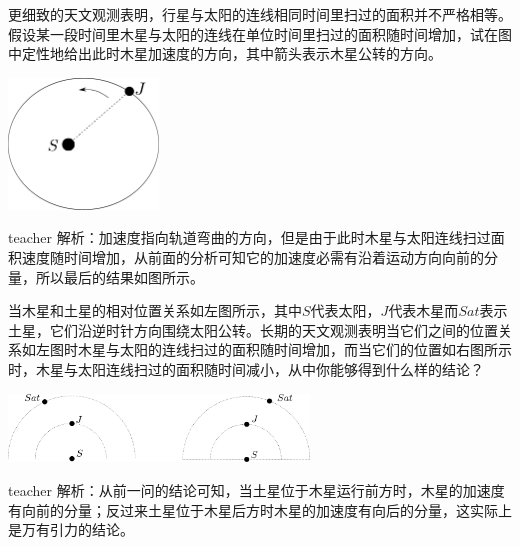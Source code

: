 \begin{example}
更细致的天文观测表明，行星与太阳的连线相同时间里扫过的面积并不严格相等。
假设某一段时间里木星与太阳的连线在单位时间里扫过的面积随时间增加，试在图中定性地给出此时木星加速度的方向，其中箭头表示木星公转的方向。
\begin{flushright}
\includegraphics[width = 0.3\textwidth]{images/motion-problem-25.pdf} 
\end{flushright}
\begin{taggedblock}{teacher}
\noindent
解析：加速度指向轨道弯曲的方向，但是由于此时木星与太阳连线扫过面积速度随时间增加，从前面的分析可知它的加速度必需有沿着运动方向向前的分量，所以最后的结果如图所示。
\end{taggedblock}
\end{example}

\begin{example}
当木星和土星的相对位置关系如左图所示，其中$S$代表太阳，$J$代表木星而$Sat$表示土星，它们沿逆时针方向围绕太阳公转。长期的天文观测表明当它们之间的位置关系如左图时木星与太阳的连线扫过的面积随时间增加，而当它们的位置如右图所示时，木星与太阳连线扫过的面积随时间减小，从中你能够得到什么样的结论？
\begin{flushright}
\includegraphics[width = 0.6\textwidth]{images/motion-problem-26.pdf} 
\end{flushright}
\begin{taggedblock}{teacher}
\noindent
解析：从前一问的结论可知，当土星位于木星运行前方时，木星的加速度有向前的分量；反过来土星位于木星后方时木星的加速度有向后的分量，这实际上是万有引力的结论。
\end{taggedblock}
\end{example}


